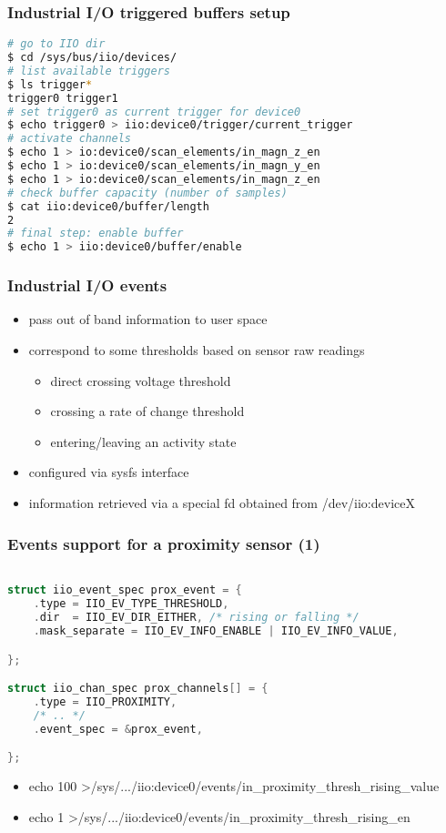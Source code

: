 \documentclass[aspectratio=169]{beamer}
\begin{document}
\begin{frame}[fragile]
\frametitle{Industrial I/O triggered buffers setup}
\begin{lstlisting}[language=bash]
# go to IIO dir
$ cd /sys/bus/iio/devices/
# list available triggers
$ ls trigger*
trigger0 trigger1
# set trigger0 as current trigger for device0
$ echo trigger0 > iio:device0/trigger/current_trigger
# activate channels
$ echo 1 > io:device0/scan_elements/in_magn_z_en
$ echo 1 > io:device0/scan_elements/in_magn_y_en
$ echo 1 > io:device0/scan_elements/in_magn_z_en
# check buffer capacity (number of samples)
$ cat iio:device0/buffer/length
2
# final step: enable buffer
$ echo 1 > iio:device0/buffer/enable
\end{lstlisting}
\end{frame}

\begin{frame}
\frametitle{Industrial I/O events}
\begin{itemize}
    \item pass out of band information to user space
    \item correspond to some thresholds based on sensor raw readings
    \begin{itemize}
        \item direct crossing voltage threshold
        \item crossing a rate of change threshold
        \item entering/leaving an activity state
   \end{itemize}
   \item configured via sysfs interface
   \item information retrieved via a special fd obtained from /dev/iio:deviceX
\end{itemize}
\end{frame}


\begin{frame}[fragile]
\frametitle{Events support for a proximity sensor (1)}
\begin{lstlisting}[language=C]

struct iio_event_spec prox_event = {
    .type = IIO_EV_TYPE_THRESHOLD,
    .dir  = IIO_EV_DIR_EITHER, /* rising or falling */
    .mask_separate = IIO_EV_INFO_ENABLE | IIO_EV_INFO_VALUE,

};

struct iio_chan_spec prox_channels[] = {
    .type = IIO_PROXIMITY,
    /* .. */
    .event_spec = &prox_event,

};
\end{lstlisting}
\begin{itemize}
    \item echo 100 \textgreater /sys/.../iio:device0/events/in\_proximity\_thresh\_rising\_value
    \item echo 1 \textgreater /sys/.../iio:device0/events/in\_proximity\_thresh\_rising\_en
\end{itemize}
\end{frame}
\end{document}
